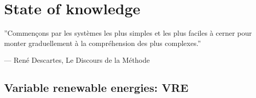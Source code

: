 
 
\chapter{State of knowledge\label{cha:state}}

\epigraphfontsize{\small\itshape}
\epigraph{''Commençons par les systèmes les plus simples et les plus faciles à cerner pour monter graduellement à la compréhension des plus complexes.''}{--- \textup{René Descartes}, Le Discours de la Méthode}

\section{Variable renewable energies: VRE}

